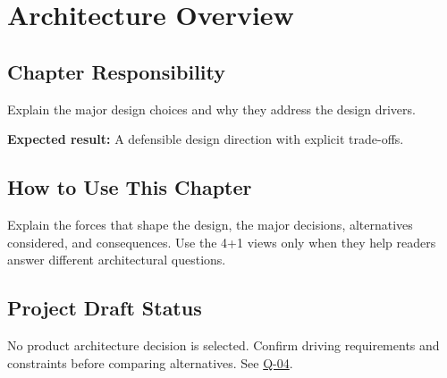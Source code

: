 \chapter{Architecture Overview}
\section{Chapter Responsibility}
\label{Section:ArchitectureOverviewResponsibility}
Explain the major design choices and why they address the design drivers.

\noindent\textbf{Expected result:} A defensible design direction with explicit trade-offs.

\section{How to Use This Chapter}
Explain the forces that shape the design, the major decisions, alternatives considered, and consequences. Use the 4+1 views only when they help readers answer different architectural questions.
\section{Project Draft Status}
No product architecture decision is selected. Confirm driving requirements and constraints before comparing alternatives. See \hyperref[Question:Q-04]{Q-04}.
